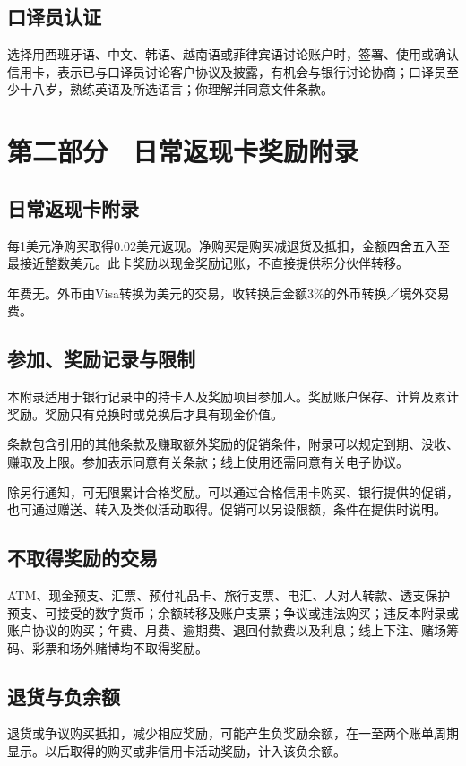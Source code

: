 \documentclass[UTF8,fontset=none,11pt,a4paper]{ctexart}
\begin{document}
\subsection*{口译员认证}
选择用西班牙语、中文、韩语、越南语或菲律宾语讨论账户时，签署、使用或确认信用卡，表示已与口译员讨论客户协议及披露，有机会与银行讨论协商；口译员至少十八岁，熟练英语及所选语言；你理解并同意文件条款。


\section*{第二部分　日常返现卡奖励附录}
\subsection*{日常返现卡附录}
每1美元净购买取得0.02美元返现。净购买是购买减退货及抵扣，金额四舍五入至最接近整数美元。此卡奖励以现金奖励记账，不直接提供积分伙伴转移。


年费无。外币由Visa转换为美元的交易，收转换后金额3\%的外币转换／境外交易费。


\subsection*{参加、奖励记录与限制}
本附录适用于银行记录中的持卡人及奖励项目参加人。奖励账户保存、计算及累计奖励。奖励只有兑换时或兑换后才具有现金价值。


条款包含引用的其他条款及赚取额外奖励的促销条件，附录可以规定到期、没收、赚取及上限。参加表示同意有关条款；线上使用还需同意有关电子协议。


除另行通知，可无限累计合格奖励。可以通过合格信用卡购买、银行提供的促销，也可通过赠送、转入及类似活动取得。促销可以另设限额，条件在提供时说明。


\subsection*{不取得奖励的交易}
ATM、现金预支、汇票、预付礼品卡、旅行支票、电汇、人对人转款、透支保护预支、可接受的数字货币；余额转移及账户支票；争议或违法购买；违反本附录或账户协议的购买；年费、月费、逾期费、退回付款费以及利息；线上下注、赌场筹码、彩票和场外赌博均不取得奖励。


\subsection*{退货与负余额}
退货或争议购买抵扣，减少相应奖励，可能产生负奖励余额，在一至两个账单周期显示。以后取得的购买或非信用卡活动奖励，计入该负余额。
\end{document}
